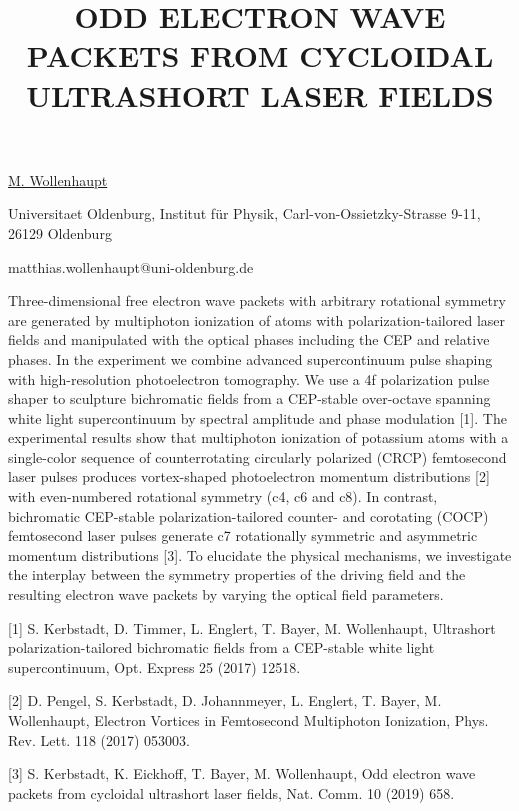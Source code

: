 \title{ODD ELECTRON WAVE PACKETS FROM CYCLOIDAL ULTRASHORT LASER FIELDS}

\underline{M. Wollenhaupt}  

{\normalsize{\vspace{-4mm}
Universitaet Oldenburg,
Institut f\"ur Physik,
Carl-von-Ossietzky-Strasse 9-11,
26129 Oldenburg




\email matthias.wollenhaupt@uni-oldenburg.de}}

Three-dimensional free electron wave packets with arbitrary rotational symmetry are generated by multiphoton ionization of atoms with polarization-tailored laser fields and manipulated with the optical phases including the CEP and relative phases. In the experiment we combine advanced supercontinuum pulse shaping with high-resolution photoelectron tomography. We use a 4f polarization pulse shaper to sculpture bichromatic fields from a CEP-stable over-octave spanning white light supercontinuum by spectral amplitude and phase modulation [1]. The experimental results show that multiphoton ionization of potassium atoms with a single-color sequence of counterrotating circularly polarized (CRCP) femtosecond laser pulses produces vortex-shaped photoelectron momentum distributions [2] with even-numbered rotational symmetry (c4, c6 and c8). In contrast, bichromatic CEP-stable polarization-tailored counter- and corotating (COCP) femtosecond laser pulses generate c7 rotationally symmetric and asymmetric momentum distributions [3]. To elucidate the physical mechanisms, we investigate the interplay between the symmetry properties of the driving field and the resulting electron wave packets by varying the optical field parameters.

{\normalsize
[1] S. Kerbstadt, D. Timmer, L. Englert, T. Bayer, M. Wollenhaupt, Ultrashort polarization-tailored bichromatic fields from a CEP-stable white light supercontinuum, Opt. Express 25 (2017) 12518.
\vsp

[2] D. Pengel, S. Kerbstadt, D. Johannmeyer, L. Englert, T. Bayer, M. Wollenhaupt, Electron Vortices in Femtosecond Multiphoton Ionization, Phys. Rev. Lett. 118 (2017) 053003.
\vsp

[3] S. Kerbstadt, K. Eickhoff, T. Bayer, M. Wollenhaupt, Odd electron wave packets from cycloidal ultrashort laser fields, Nat. Comm. 10 (2019) 658.
}

\vspace{\baselineskip}

